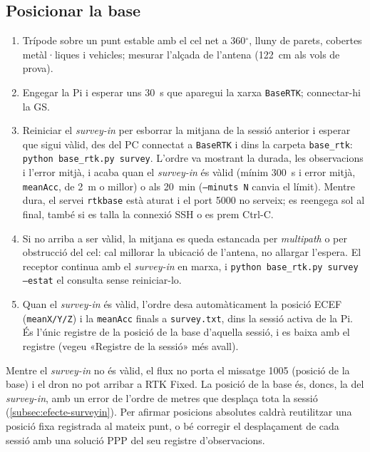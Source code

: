 \subsection{Posicionar la base}
\begin{enumerate}[label=\alph*)]
    \item Trípode sobre un punt estable amb el cel net a 360$^{\circ}$, lluny de parets, cobertes metàl·liques i vehicles; mesurar l'alçada de l'antena (122~cm als vols de prova).
    \item Engegar la Pi i esperar uns 30~s que aparegui la xarxa \texttt{BaseRTK}; connectar-hi la GS.
    \item Reiniciar el \emph{survey-in} per esborrar la mitjana de la sessió anterior i esperar que sigui vàlid, des del PC connectat a \texttt{BaseRTK} i dins la carpeta \texttt{base\_rtk}: \texttt{python base\_rtk.py survey}. L'ordre va mostrant la durada, les observacions i l'error mitjà, i acaba quan el \emph{survey-in} és vàlid (mínim 300~s i error mitjà, \texttt{meanAcc}, de 2~m o millor) o als 20~min (\texttt{--minuts N} canvia el límit). Mentre dura, el servei \texttt{rtkbase} està aturat i el port 5000 no serveix; es reengega sol al final, també si es talla la connexió SSH o es prem Ctrl-C.
    \item Si no arriba a ser vàlid, la mitjana es queda estancada per \emph{multipath} o per obstrucció del cel: cal millorar la ubicació de l'antena, no allargar l'espera. El receptor continua amb el \emph{survey-in} en marxa, i \texttt{python base\_rtk.py survey --estat} el consulta sense reiniciar-lo.
    \item Quan el \emph{survey-in} és vàlid, l'ordre desa automàticament la posició ECEF (\texttt{meanX/Y/Z}) i la \texttt{meanAcc} finals a \texttt{survey.txt}, dins la sessió activa de la Pi. És l'únic registre de la posició de la base d'aquella sessió, i es baixa amb el registre (vegeu «Registre de la sessió» més avall).
\end{enumerate}

Mentre el \emph{survey-in} no és vàlid, el flux no porta el missatge 1005 (posició de la base) i el dron no pot arribar a RTK Fixed. La posició de la base és, doncs, la del \emph{survey-in}, amb un error de l'ordre de metres que desplaça tota la sessió (\cref{subsec:efecte-surveyin}). Per afirmar posicions absolutes caldrà reutilitzar una posició fixa registrada al mateix punt, o bé corregir el desplaçament de cada sessió amb una solució PPP del seu registre d'observacions.

